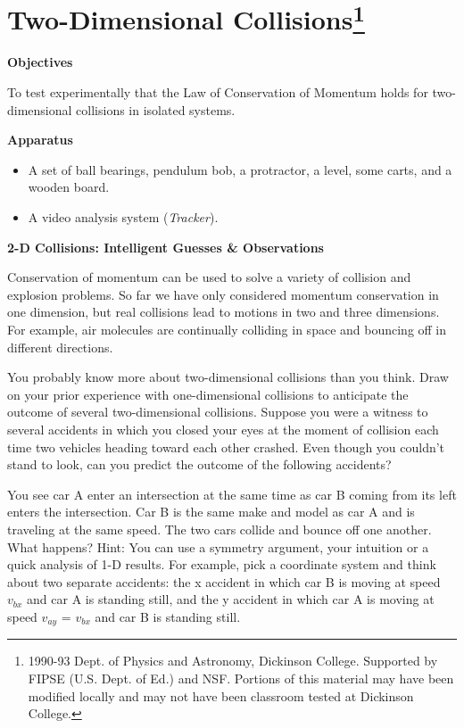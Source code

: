 
\section{Two-Dimensional Collisions\footnote{
1990-93 Dept. of Physics and Astronomy, Dickinson College. Supported by FIPSE
(U.S. Dept. of Ed.) and NSF. Portions of this material may have been modified
locally and may not have been classroom tested at Dickinson College.
}}

\makelabheader %

\textbf{Objectives} 

To test experimentally that the Law of Conservation of Momentum holds for two-dimensional
collisions in isolated systems.

\textbf{Apparatus}

\begin{itemize}
\item A set of ball bearings, pendulum bob, a protractor, a level, some carts, 
and a wooden board.
\item A video analysis system (\textit{Tracker}).
\end{itemize}
\textbf{2-D Collisions: Intelligent Guesses \& Observations }

Conservation of momentum can be used to solve a variety of collision and explosion
problems. So far we have only considered momentum conservation in one dimension,
but real collisions lead to motions in two and three dimensions. For example,
air molecules are continually colliding in space and bouncing off in different
directions. 

You probably know more about two-dimensional collisions than you think. Draw
on your prior experience with one-dimensional collisions to anticipate the outcome
of several two-dimensional collisions. Suppose you were a witness to several
accidents in which you closed your eyes at the moment of collision each time
two vehicles heading toward each other crashed. Even though you couldn't stand
to look, can you predict the outcome of the following accidents?

You see car A enter an intersection at the same time as car B coming from its
left enters the intersection. Car B is the same make and model as car A and
is traveling at the same speed. The two cars collide and bounce off one another.
What happens? Hint: You can use a symmetry argument, your intuition or a quick
analysis of 1-D results. For example, pick a coordinate system and think about
two separate accidents: the x accident in which car B is moving at speed \( v_{bx} \)
and car A is standing still, and the y accident in which car A is moving at
speed \( v_{ay} \) = \( v_{bx} \) and car B is standing still. 

